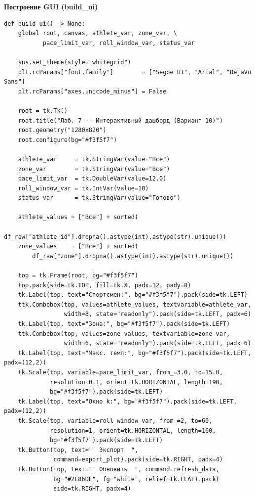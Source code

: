 \documentclass[oneside,a4paper,14pt]{extarticle}
\begin{document}
\newpage
\textbf{Построение GUI (build\_ui)}
\small
\begin{verbatim}
def build_ui() -> None:
    global root, canvas, athlete_var, zone_var, \
           pace_limit_var, roll_window_var, status_var

    sns.set_theme(style="whitegrid")
    plt.rcParams["font.family"]        = ["Segoe UI", "Arial", "DejaVu Sans"]
    plt.rcParams["axes.unicode_minus"] = False

    root = tk.Tk()
    root.title("Лаб. 7 -- Интерактивный дашборд (Вариант 10)")
    root.geometry("1280x820")
    root.configure(bg="#f3f5f7")

    athlete_var     = tk.StringVar(value="Все")
    zone_var        = tk.StringVar(value="Все")
    pace_limit_var  = tk.DoubleVar(value=12.0)
    roll_window_var = tk.IntVar(value=10)
    status_var      = tk.StringVar(value="Готово")

    athlete_values = ["Все"] + sorted(
        df_raw["athlete_id"].dropna().astype(int).astype(str).unique())
    zone_values    = ["Все"] + sorted(
        df_raw["zone"].dropna().astype(int).astype(str).unique())

    top = tk.Frame(root, bg="#f3f5f7")
    top.pack(side=tk.TOP, fill=tk.X, padx=12, pady=8)
    tk.Label(top, text="Спортсмен:", bg="#f3f5f7").pack(side=tk.LEFT)
    ttk.Combobox(top, values=athlete_values, textvariable=athlete_var,
                 width=8, state="readonly").pack(side=tk.LEFT, padx=6)
    tk.Label(top, text="Зона:", bg="#f3f5f7").pack(side=tk.LEFT)
    ttk.Combobox(top, values=zone_values, textvariable=zone_var,
                 width=6, state="readonly").pack(side=tk.LEFT, padx=6)
    tk.Label(top, text="Макс. темп:", bg="#f3f5f7").pack(side=tk.LEFT, padx=(12,2))
    tk.Scale(top, variable=pace_limit_var, from_=3.0, to=15.0,
             resolution=0.1, orient=tk.HORIZONTAL, length=190,
             bg="#f3f5f7").pack(side=tk.LEFT)
    tk.Label(top, text="Окно k:", bg="#f3f5f7").pack(side=tk.LEFT, padx=(12,2))
    tk.Scale(top, variable=roll_window_var, from_=2, to=60,
             resolution=1, orient=tk.HORIZONTAL, length=160,
             bg="#f3f5f7").pack(side=tk.LEFT)
    tk.Button(top, text="  Экспорт  ",
              command=export_plot).pack(side=tk.RIGHT, padx=4)
    tk.Button(top, text="  Обновить  ", command=refresh_data,
              bg="#2E86DE", fg="white", relief=tk.FLAT).pack(
              side=tk.RIGHT, padx=4)


\end{verbatim}
\end{document}
